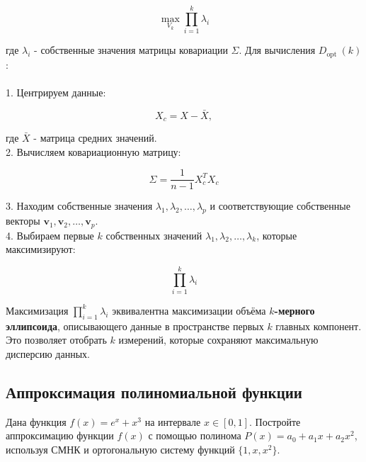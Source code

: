 $$
\max _{V_k} \prod_{i=1}^k \lambda_i
$$


где $\lambda_i$ - собственные значения матрицы ковариации $\Sigma$.
Для вычисления $D_{\text {opt }}(k)$ :\\
\\
1. Центрируем данные:

$$
X_c=X-\bar{X},
$$


где $\bar{X}$ - матрица средних значений.\\
2. Вычисляем ковариационную матрицу:

$$
\Sigma=\frac{1}{n-1} X_c^T X_c
$$

3. Находим собственные значения $\lambda_1, \lambda_2, \ldots, \lambda_p$ и соответствующие собственные векторы $\mathbf{v}_1, \mathbf{v}_2, \ldots, \mathbf{v}_p$.\\
4. Выбираем первые $k$ собственных значений $\lambda_1, \lambda_2, \ldots, \lambda_k$, которые максимизируют:

$$
\prod_{i=1}^k \lambda_i
$$


Максимизация $\prod_{i=1}^k \lambda_i$ эквивалентна максимизации объёма \textbf{$k$-мерного эллипсоида}, описывающего данные в пространстве первых $k$ главных компонент. Это позволяет отобрать $k$ измерений, которые сохраняют максимальную дисперсию данных.

\subsection{Аппроксимация полиномиальной функции}
Дана функция $f(x) = e^x + x^3$ на интервале $x \in [0, 1]$. Постройте аппроксимацию функции $f(x)$ с помощью полинома $P(x) = a_0 + a_1 x + a_2 x^2$, используя СМНК и ортогональную систему функций $\{1, x, x^2\}$.

